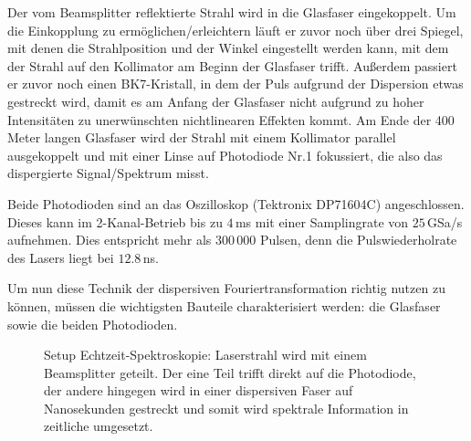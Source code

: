\documentclass[bachelor,       %
               twoside,        %
               BCOR10mm,       %
               english,ngerman, %
               ]{GAUBM}
\begin{document}
Der vom Beamsplitter reflektierte Strahl wird in die Glasfaser eingekoppelt.
Um die Einkopplung zu ermöglichen/erleichtern läuft er zuvor noch über drei Spiegel, mit denen die Strahlposition und der Winkel eingestellt werden kann, mit dem der Strahl auf den Kollimator am Beginn der Glasfaser trifft.
Außerdem passiert er zuvor noch einen BK7-Kristall, in dem der Puls aufgrund der Dispersion etwas gestreckt wird, damit es am Anfang der Glasfaser nicht aufgrund zu hoher Intensitäten zu unerwünschten nichtlinearen Effekten kommt.
Am Ende der 400 Meter langen Glasfaser wird der Strahl mit einem Kollimator parallel ausgekoppelt und mit einer Linse auf Photodiode Nr.1 fokussiert, die also das dispergierte Signal/Spektrum misst.

Beide Photodioden sind an das Oszilloskop (Tektronix DP71604C) angeschlossen.
Dieses kann im 2-Kanal-Betrieb bis zu $4\,$ms mit einer Samplingrate von $25\,$GSa/s aufnehmen.
Dies entspricht mehr als 300\,000 Pulsen, denn die Pulswiederholrate des Lasers liegt bei $12.8\,$ns.


Um nun diese Technik der dispersiven Fouriertransformation richtig nutzen zu können, müssen die wichtigsten Bauteile charakterisiert werden: die Glasfaser sowie die beiden Photodioden.

\begin{figure}[!htb]
	\centering
	\def\svgwidth{\columnwidth}
	
	\caption{Setup Echtzeit-Spektroskopie: Laserstrahl wird mit einem Beamsplitter geteilt. Der eine Teil trifft direkt auf die Photodiode, der andere hingegen wird in einer dispersiven Faser auf Nanosekunden gestreckt und somit wird spektrale Information  in zeitliche  umgesetzt.}
	\label{fig:DFTSetup}
\end{figure}
\end{document}
